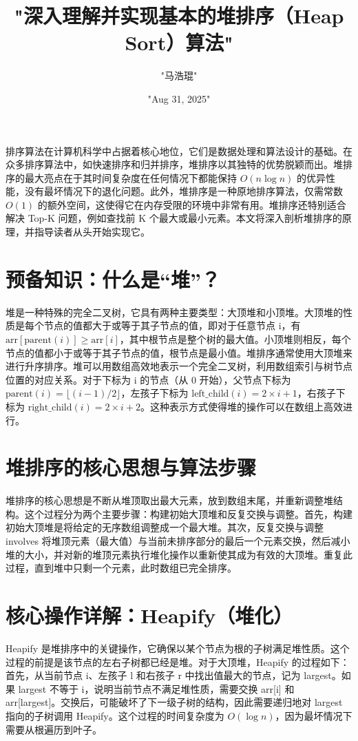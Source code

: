 \title{"深入理解并实现基本的堆排序（Heap Sort）算法"}
\author{"马浩琨"}
\date{"Aug 31, 2025"}
\maketitle
排序算法在计算机科学中占据着核心地位，它们是数据处理和算法设计的基础。在众多排序算法中，如快速排序和归并排序，堆排序以其独特的优势脱颖而出。堆排序的最大亮点在于其时间复杂度在任何情况下都能保持 $O(n\log{n})$ 的优异性能，没有最坏情况下的退化问题。此外，堆排序是一种原地排序算法，仅需常数 $O(1)$ 的额外空间，这使得它在内存受限的环境中非常有用。堆排序还特别适合解决 Top-K 问题，例如查找前 K 个最大或最小元素。本文将深入剖析堆排序的原理，并指导读者从头开始实现它。\par
\chapter{预备知识：什么是“堆”？}
堆是一种特殊的完全二叉树，它具有两种主要类型：大顶堆和小顶堆。大顶堆的性质是每个节点的值都大于或等于其子节点的值，即对于任意节点 i，有 $\text{arr}[\text{parent}(i)] \geq\text{arr}[i]$，其中根节点是整个树的最大值。小顶堆则相反，每个节点的值都小于或等于其子节点的值，根节点是最小值。堆排序通常使用大顶堆来进行升序排序。堆可以用数组高效地表示一个完全二叉树，利用数组索引与树节点位置的对应关系。对于下标为 i 的节点（从 0 开始），父节点下标为 $\text{parent}(i) = \lfloor(i - 1) / 2 \rfloor$，左孩子下标为 $\text{left\_child}(i) = 2\times{i} + 1$，右孩子下标为 $\text{right\_child}(i) = 2\times{i} + 2$。这种表示方式使得堆的操作可以在数组上高效进行。\par
\chapter{堆排序的核心思想与算法步骤}
堆排序的核心思想是不断从堆顶取出最大元素，放到数组末尾，并重新调整堆结构。这个过程分为两个主要步骤：构建初始大顶堆和反复交换与调整。首先，构建初始大顶堆是将给定的无序数组调整成一个最大堆。其次，反复交换与调整 involves 将堆顶元素（最大值）与当前未排序部分的最后一个元素交换，然后减小堆的大小，并对新的堆顶元素执行堆化操作以重新使其成为有效的大顶堆。重复此过程，直到堆中只剩一个元素，此时数组已完全排序。\par
\chapter{核心操作详解：Heapify（堆化）}
Heapify 是堆排序中的关键操作，它确保以某个节点为根的子树满足堆性质。这个过程的前提是该节点的左右子树都已经是堆。对于大顶堆，Heapify 的过程如下：首先，从当前节点 i、左孩子 l 和右孩子 r 中找出值最大的节点，记为 largest。如果 largest 不等于 i，说明当前节点不满足堆性质，需要交换 arr[i] 和 arr[largest]。交换后，可能破坏了下一级子树的结构，因此需要递归地对 largest 指向的子树调用 Heapify。这个过程的时间复杂度为 $O(\log{n})$，因为最坏情况下需要从根遍历到叶子。\par
